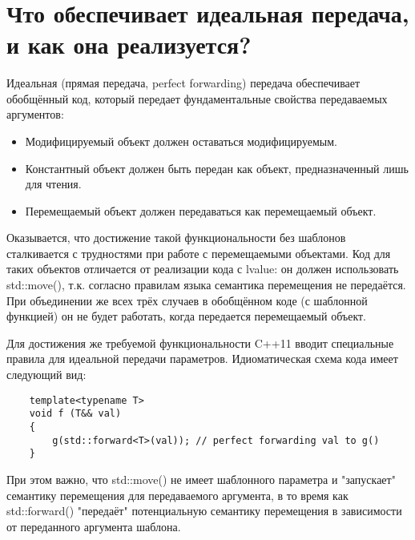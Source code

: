 \documentclass[a4paper,12pt]{article}	%
\title{
	\center{\textbf{Контрольные вопросы}}
	}
\begin{document}

\maketitle

\section{Что обеспечивает идеальная передача, и как она реализуется?}
	
	Идеальная (прямая передача, perfect forwarding) передача обеспечивает обобщённый код, который передает фундаментальные свойства передаваемых аргументов:
	
	\begin{itemize}
	
		\item Модифицируемый объект должен оставаться модифицируемым.
	
		\item Константный объект должен быть передан как объект, предназначенный лишь для чтения.
	
		\item Перемещаемый объект должен передаваться как перемещаемый объект.
	
	\end{itemize}
	
	Оказывается, что достижение такой функциональности без шаблонов сталкивается с трудностями при работе с перемещаемыми объектами. Код для таких объектов отличается от реализации кода с lvalue: он должен использовать std::move(), т.к. согласно правилам языка семантика перемещения не передаётся. При объединении же всех трёх случаев в обобщённом коде (с шаблонной функцией) он не будет работать, когда передается перемещаемый объект.
		
	Для достижения же требуемой функциональности  C++11 вводит специальные правила для идеальной передачи параметров. Идиоматическая схема кода имеет следующий вид:
	
	\begin{lstlisting}
	template<typename T>
	void f (T&& val)
	{
		g(std::forward<T>(val)); // perfect forwarding val to g()
	}
	\end{lstlisting}
	
	При этом важно, что std::move() не имеет шаблонного параметра и "запускает" семантику перемещения для передаваемого аргумента, в то время как std::forward() "передаёт" потенциальную семантику перемещения в зависимости от переданного аргумента шаблона.
	
\end{document}
